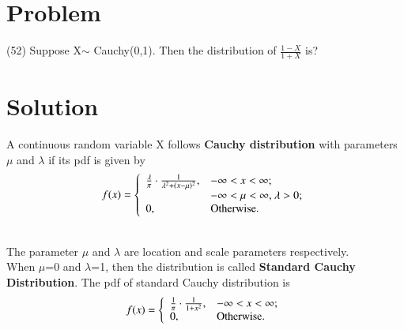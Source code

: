 \documentclass[journal,12pt,twocolumn]{IEEEtran}
\begin{document}
\section{Problem}
(52) Suppose X$\sim$ Cauchy(0,1). Then the distribution of
$\frac{1-X}{1+X}$ is?
\section{Solution}
A continuous random variable X follows \textbf{Cauchy distribution} with parameters $\mu$ and $\lambda$ if its pdf is given by
\\
    \begin{equation*} f(x) =\left\{ \begin{array}{ll} \frac{\lambda}{\pi}\cdot \frac{1}{\lambda^2+(x-\mu)^2}, & \hbox{$-\infty < x< \infty$;} \\ & \hbox{$-\infty < \mu< \infty$, $\lambda>0$;} \\ 0, & \hbox{Otherwise.} \end{array} \right. \end{equation*}
    
\\
The parameter $\mu$ and $\lambda$ are location and scale parameters respectively. 
\\
When $\mu$=0 and $\lambda$=1, then the distribution is called \textbf{Standard Cauchy Distribution}. The pdf of standard Cauchy distribution is
\\
\begin{equation*} f(x) =\left\{ \begin{array}{ll} \frac{1}{\pi}\cdot \frac{1}{1+x^2}, & \hbox{$-\infty < x< \infty$;} \\ 0, & \hbox{Otherwise.} \end{array} \right. \end{equation*}
\end{document}
